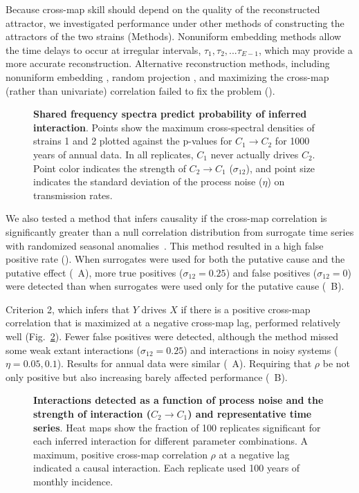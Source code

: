 \documentclass[10pt,letterpaper]{article}
\begin{document}
Because cross-map skill should depend on the quality of the reconstructed attractor, we investigated performance under other methods of constructing the attractors of the two strains (Methods).
Nonuniform embedding methods allow the time delays to occur at irregular intervals, $\tau_1, \tau_2, ... \tau_{E-1}$, which may provide a more accurate reconstruction.
Alternative reconstruction methods, including nonuniform embedding \cite{Nichkawde2013, Uzal2011}, random projection \cite{Tajima2015}, and maximizing the cross-map (rather than univariate) correlation failed to fix the problem ().

\begin{figure}
  \caption{\textbf{Shared frequency spectra predict probability of inferred interaction}. Points show the maximum cross-spectral densities of strains 1 and 2 plotted against the p-values for $C_1 \rightarrow C_2$ for 1000 years of annual data. In all replicates, $C_1$ never actually drives $C_2$. Point color indicates the strength of $C_2 \rightarrow C_1$ ($\sigma_{12}$), and point size indicates the standard deviation of the process noise ($\eta$) on transmission rates. \label{fig:max_crossspec_tmp}} 
\end{figure}

We also tested a method that infers causality if the cross-map correlation is significantly greater than a null correlation distribution from surrogate time series with randomized seasonal anomalies~\cite{Deyle2016b}.
This method resulted in a high false positive rate ().
When surrogates were used for both the putative cause and the putative effect (~A), more true positives ($\sigma_{12} = 0.25$) and false positives ($\sigma_{12} = 0$) were detected than when surrogates were used only for the putative cause (~B).

Criterion 2, which infers that $Y$ drives $X$ if there is a positive cross-map correlation that is maximized at a negative cross-map lag, performed relatively well (Fig.~\ref{fig:univar_monthly_lag_seas_diff_tmp}).
Fewer false positives were detected, although the method missed some weak extant interactions ($\sigma_{12}=0.25$) and interactions in noisy systems ($\eta=0.05, 0.1$).
Results for annual data were similar (~A).
Requiring that $\rho$ be not only positive but also increasing barely affected performance (~B). 

\begin{figure}
  \caption{\textbf{Interactions detected as a function of process noise and the strength of interaction ($C_2 \rightarrow C_1$) and representative time series}. Heat maps show the fraction of 100 replicates significant for each inferred interaction for different parameter combinations. A maximum, positive cross-map correlation $\rho$ at a negative lag indicated a causal interaction. Each replicate used 100 years of monthly incidence. \label{fig:univar_monthly_lag_seas_diff_tmp}} 
\end{figure}
\end{document}

